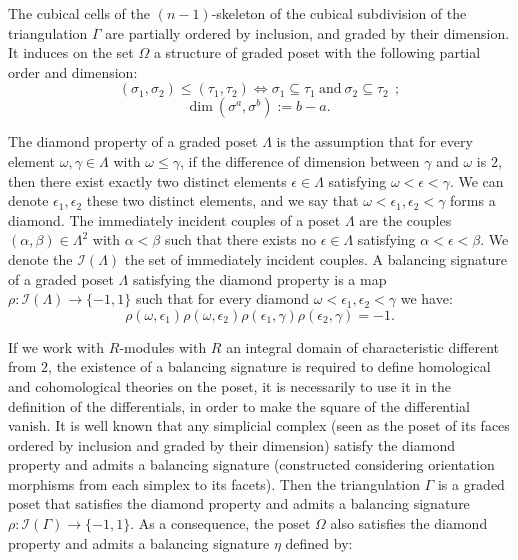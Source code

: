 \documentclass{article}
\begin{document}
The cubical cells of the $(n-1)$-skeleton of the cubical subdivision of the triangulation $\Gamma$ are partially ordered by inclusion, and graded by their dimension. It induces on the set $\Omega$ a structure of graded poset with the following partial order and dimension:
\begin{equation*}
    (\sigma_1,\sigma_2) \leq (\tau_1,\tau_2) \iff\sigma_1\subseteq\tau_1 ~\mathrm{and}~\sigma_2\subseteq\tau_2~~;
\end{equation*}
\begin{equation*}
    \mathrm{dim}~(\sigma^a,\sigma^b):=b-a.
\end{equation*}

The diamond property of a graded poset $\Lambda$ is the assumption that for every element $\omega,\gamma\in\Lambda$ with $\omega\leq \gamma$, if the difference of dimension between $\gamma$ and $\omega$ is $2$, then there exist exactly two distinct elements $\epsilon\in\Lambda$ satisfying $\omega <\epsilon< \gamma$. We can denote $\epsilon_1,\epsilon_2$ these two distinct elements, and we say that $\omega<\epsilon_1,\epsilon_2<\gamma$ forms a diamond. The immediately incident couples of a poset $\Lambda$ are the couples $(\alpha,\beta)\in\Lambda^2$ with $\alpha <\beta$ such that there exists no $\epsilon\in\Lambda$ satisfying $\alpha <\epsilon<\beta$. We denote the $\mathcal{I}(\Lambda)$ the set of immediately incident couples. A balancing signature of a graded poset $\Lambda$ satisfying the diamond property is a map $\rho: \mathcal{I}(\Lambda)\rightarrow\{-1,1\}$ such that for every diamond $\omega<\epsilon_1,\epsilon_2<\gamma$ we have:
$$\rho(\omega,\epsilon_1)\rho(\omega,\epsilon_2)\rho(\epsilon_1,\gamma)\rho(\epsilon_2,\gamma) =-1.$$

If we work with $R$-modules with $R$ an integral domain of characteristic different from $2$, the existence of a balancing signature is required to define homological and cohomological theories on the poset, it is necessarily to use it in the definition of the differentials, in order to make the square of the differential vanish. It is well known that any simplicial complex (seen as the poset of its faces ordered by inclusion and graded by their dimension) satisfy the diamond property and admits a balancing signature (constructed considering orientation morphisms from each simplex to its facets). Then the triangulation $\Gamma$ is a graded poset that satisfies the diamond property and admits a balancing signature $\rho:\mathcal{I}(\Gamma)\rightarrow\{-1,1\}$. As a consequence, the poset $\Omega$ also satisfies the diamond property and admits a balancing signature $\eta$ defined by:
\end{document}
